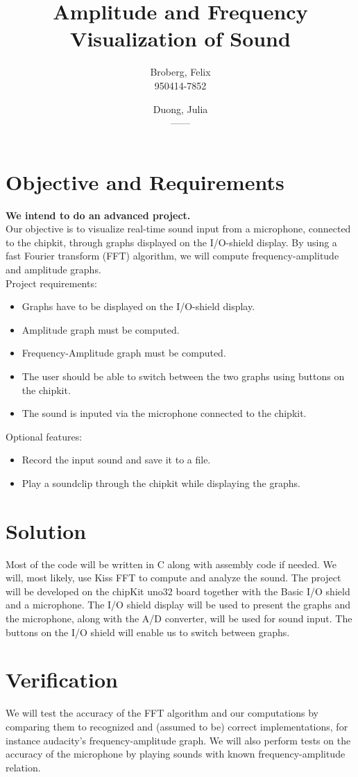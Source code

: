 \documentclass[a4paper,11pt]{article}
\author{
  Broberg, Felix\\
  950414-7852
  \and
  Duong, Julia\\
  ------
}
\title{Amplitude and Frequency Visualization of Sound}
\begin{document}
\maketitle


\section*{Objective and Requirements}
\textbf{We intend to do an advanced project.}\\
Our objective is to visualize real-time sound input from a microphone, connected to the chipkit, through graphs displayed on the I/O-shield display. By using a fast Fourier transform (FFT) algorithm, we will compute frequency-amplitude and amplitude graphs.\\
\newline
Project requirements:
\begin{itemize}
\item Graphs have to be displayed on the I/O-shield display.
\item Amplitude graph must be computed.
\item Frequency-Amplitude graph must be computed.
\item The user should be able to switch between the two graphs using buttons on the chipkit.
\item The sound is inputed via the microphone connected to the chipkit.
\end{itemize}
Optional features:
\begin{itemize}
\item Record the input sound and save it to a file.
\item Play a soundclip through the chipkit while displaying the graphs.
\end{itemize}
\section*{Solution}
Most of the code will be written in C along with assembly code if needed. We will, most likely, use Kiss FFT to compute and analyze the sound. The project will be developed on the chipKit uno32 board together with the Basic I/O shield and a microphone. The I/O shield display will be used to present the graphs and the microphone, along with the A/D converter, will be used for sound input. The buttons on the I/O shield will enable us to switch between graphs.
\section*{Verification}
We will test the accuracy of the FFT algorithm and our computations by comparing them to recognized and (assumed to be) correct implementations, for instance audacity's frequency-amplitude graph. We will also perform tests on the accuracy of the microphone by playing sounds with known frequency-amplitude relation.
\end{document}
